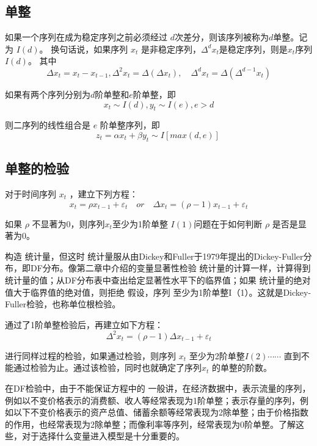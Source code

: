 	\subsection{单整}
	
		如果一个序列在成为稳定序列之前必须经过 $ d $次差分，则该序列被称为$ d $单整。记为 $ I(d) $。
		换句话说，如果序列 $ x_{t} $ 是非稳定序列，$ \Delta^{d} x_{t} $是稳定序列，则是$ x_{t} $序列$ I(d) $。
		其中
		\vspace{-0.5em}
		$$ \Delta x_{t}=x_{t}-x_{t-1}, \Delta^{2} x_{t}=\Delta\left(\Delta x_{t}\right), \quad  \Delta^{d} x_{t}
		=\Delta\left(\Delta^{d-1} x_{t}\right) $$
		
		如果有两个序列分别为$ d $阶单整和$ e $阶单整，即
		\vspace{-0.5em}
		$$ x_{t} \sim I(d), y_{t} \sim I(e), e>d $$
		
		则二序列的线性组合是 $ e $ 阶单整序列，即
		\vspace{-0.5em}
		$$ z_{t}=\alpha x_{t}+\beta y_{t} \sim I\left[max (d, e)\right]\ $$
		
	\subsection{单整的检验}
		对于时间序列 $ x_{t} $ ，建立下列方程：
		\vspace{-0.5em}
		$$ x_{t}=\rho x_{t-1}+\varepsilon_{t} \quad or \quad \Delta x_{t}=(\rho-1) x_{t-1}+\varepsilon_{t} $$
		
		如果 $ \rho $ 不显著为0，则序列$ x_{t} $至少为1阶单整 $ I(1) $问题在于如何判断 $ \rho $  是否是显著为0。
		
		构造 统计量，但这时 统计量服从由Dickey和Fuller于1979年提出的Dickey-Fuller分布，即DF分布。像第二章中介绍的变量显著性检验 统计量的计算一样，计算得到 统计量的值；从DF分布表中查出给定显著性水平下的临界值；如果 统计量的绝对值大于临界值的绝对值，则拒绝 假设，序列 至少为1阶单整I（1）。这就是Dickey-Fuller检验，也称单位根检验。
		
		通过了1阶单整检验后，再建立如下方程：
		\vspace{-0.5em}
		$$ \Delta^{2} x_{t}=(\rho-1) \Delta x_{t-1}+\varepsilon_{t} $$
		
		进行同样过程的检验，如果通过检验，则序列 $ x_{t} $ 至少为2阶单整$ I(2) \cdots  \cdots$ 
		直到不能通过检验为止。通过该检验，同时也就确定了序列$ x_{t} $ 的单整的阶数。
		

		在DF检验中，由于不能保证方程中的		一般讲，在经济数据中，表示流量的序列，例如以不变价格表示的消费额、收人等经常表现为1阶单整；表示存量的序列，例如以下不变价格表示的资产总值、储蓄余额等经常表现为2除单整；由于价格指数的作用，也经常表现为2除单整；而像利率等序列，经常表现为0阶单整。了解这些，对于选择什么变量进入模型是十分重要的。
		
